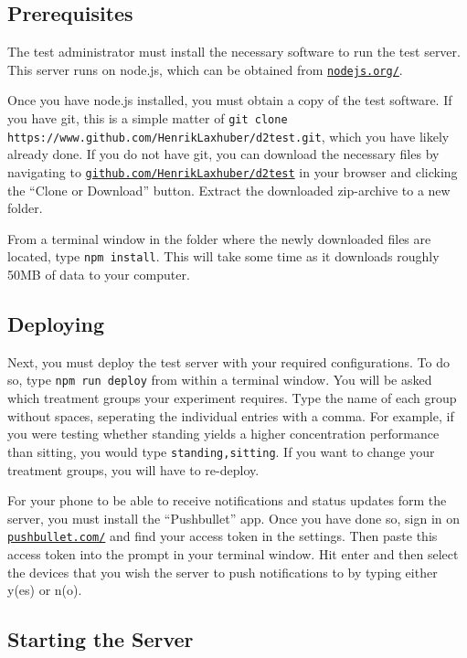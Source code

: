 \documentclass[a4paper,11pt,british,oneside]{article}
\begin{document}
\subsection{Prerequisites}
The test administrator must install the necessary software to run the test server. This server runs on node.js, which can be obtained from \href{https://nodejs.org/}{\nolinkurl{nodejs.org/}}.

Once you have node.js installed, you must obtain a copy of the test software. If you have git, this is a simple matter of \texttt{git clone \nolinkurl{https://www.github.com/HenrikLaxhuber/d2test.git}}, which you have likely already done. If you do not have git, you can download the necessary files by navigating to \href{https://www.github.com/HenrikLaxhuber/d2test}{\nolinkurl{github.com/HenrikLaxhuber/d2test}} in your browser and clicking the \enquote{Clone or Download} button. Extract the downloaded zip-archive to a new folder.

From a terminal window in the folder where the newly downloaded files are located, type \texttt{npm install}. This will take some time as it downloads roughly 50MB of data to your computer.

\subsection{Deploying}

Next, you must deploy the test server with your required configurations. To do so, type \texttt{npm run deploy} from within a terminal window. You will be asked which treatment groups your experiment requires. Type the name of each group without spaces, seperating the individual entries with a comma. For example, if you were testing whether standing yields a higher concentration performance than sitting, you would type \texttt{standing,sitting}. If you want to change your treatment groups, you will have to re-deploy.

For your phone to be able to receive notifications and status updates form the server, you must install the \enquote{Pushbullet} app. Once you have done so, sign in on \href{https://www.pushbullet.com/}{\nolinkurl{pushbullet.com/}} and find your access token in the settings. Then paste this access token into the prompt in your terminal window. Hit enter and then select the devices that you wish the server to push notifications to by typing either y(es) or n(o).

\subsection{Starting the Server}
\end{document}
